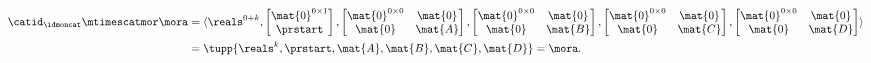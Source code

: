 \begin{example}
\begin{equation*}
\begin{aligned}
            \catid_\idmoncat \mtimescatmor \mora & =
            \langle \reals^{0+k}, \begin{bmatrix}\mat{0}^{0\times 1}\\ \prstart\end{bmatrix},
            \begin{bmatrix}\mat{0}^{0\times 0}&\mat{0}\\\mat{0}&\mat{A}\end{bmatrix},
            \begin{bmatrix}\mat{0}^{0\times 0}&\mat{0}\\\mat{0}&\mat{B}\end{bmatrix},
            \begin{bmatrix}\mat{0}^{0\times 0}&\mat{0}\\\mat{0}&\mat{C}\end{bmatrix},
            \begin{bmatrix}\mat{0}^{0\times 0}&\mat{0}\\\mat{0}&\mat{D}\end{bmatrix}\rangle \\
                                                 & =\tupp{\reals^k, \prstart, \mat{A}, \mat{B}, \mat{C}, \mat{D}} = \mora.
        \end{aligned}
    \end{equation*}
\end{example}

